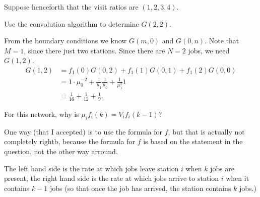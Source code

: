 Suppose henceforth that the visit ratios are $(1,2,3,4)$. 

\begin{exercise}[201706]
  Use the convolution algorithm to determine $G(2,2)$.
\begin{solution}
    From the boundary conditions we know $G(m, 0)$ and $G(0,n)$. Note
    that $M=1$, since there just two stations. Since there are $N=2$
    jobs, we need $G(1,2)$. 
    \begin{equation*}
      \begin{split}
      G(1,2) &= f_1(0) G(0, 2) + f_1(1) G(0, 1) + f_1(2) G(0,0) \\
       &= 1\cdot \mu_0^{-2}  + \frac1{\mu_1} \frac{1}{\mu_0}  + \frac{1}{\mu_1^2} 1 \\
       &= \frac 1{16} + \frac1{12}  + \frac{1}{9}.
      \end{split}
    \end{equation*}
\end{solution}
\end{exercise}

\begin{exercise}[201706]
For this network, why is $\mu_i f_i(k) = V_i f_i(k-1)$? 
\begin{solution}
  One way (that I accepted)  is to use the formula for $f$, but that is actually not completely rightb, because the formula for $f$ is based on the statement in the question, not the other way arround. 

The left hand side is the rate at which jobs leave station $i$ when $k$ jobs are present, the right hand side is the rate at which jobs arrive to station $i$ when it contains $k-1$ jobs (so that once the job has arrived, the station contains $k$ jobs.)
\end{solution}
\end{exercise}




